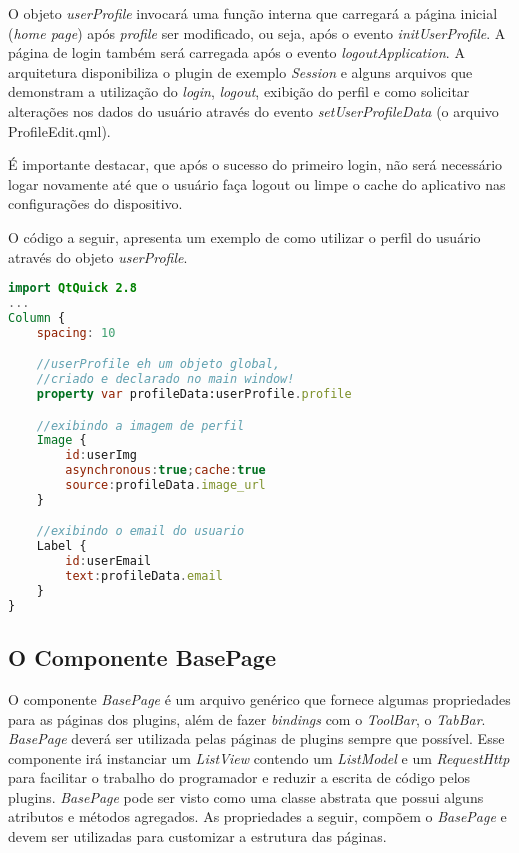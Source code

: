 O objeto \textit{userProfile} invocará uma função interna que carregará a página inicial (\textit{home page}) após \textit{profile} ser modificado, ou seja, após o evento \textit{initUserProfile}. A página de login também será carregada após o evento \textit{logoutApplication}. A arquitetura disponibiliza o plugin de exemplo \textit{Session} e alguns arquivos que demonstram a utilização do \textit{login}, \textit{logout}, exibição do perfil e como solicitar alterações nos dados do usuário através do evento \textit{setUserProfileData} (o arquivo ProfileEdit.qml).\par

É importante destacar, que após o sucesso do primeiro login, não será necessário logar novamente até que o usuário faça logout ou limpe o cache do aplicativo nas configurações do dispositivo.\par

O código a seguir, apresenta um exemplo de como utilizar o perfil do usuário através do objeto \textit{userProfile}.

\begin{center}
\begin{lstlisting}[language=qml]
import QtQuick 2.8
...
Column {
	spacing: 10

	//userProfile eh um objeto global,
	//criado e declarado no main window!
	property var profileData:userProfile.profile

	//exibindo a imagem de perfil
	Image {
		id:userImg
		asynchronous:true;cache:true
		source:profileData.image_url
	}

	//exibindo o email do usuario
	Label {
		id:userEmail
		text:profileData.email
	}
}
\end{lstlisting}
\end{center}


\subsection{O Componente BasePage}\label{sec:solucao-desenvolvida}
O componente \textit{BasePage} é um arquivo genérico que fornece algumas propriedades para as páginas dos plugins, além de fazer \textit{bindings} com o \textit{ToolBar}, o \textit{TabBar}. \textit{BasePage} deverá ser utilizada pelas páginas de plugins sempre que possível. Esse componente irá instanciar um \textit{ListView} contendo um \textit{ListModel} e um \textit{RequestHttp} para facilitar o trabalho do programador e reduzir a escrita de código pelos plugins. \textit{BasePage} pode ser visto como uma classe abstrata que possui alguns atributos e métodos agregados. As propriedades a seguir, compõem o \textit{BasePage} e devem ser utilizadas para customizar a estrutura das páginas.

